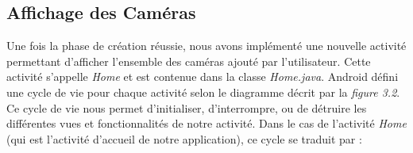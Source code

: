 \subsection{Affichage des Caméras}
Une fois la phase de création réussie, nous avons implémenté une nouvelle
activité permettant d'afficher l'ensemble des caméras ajouté par l'utilisateur.
Cette activité s'appelle \textit{Home} et est contenue dans la classe
\textit{Home.java}.\newline \newline
\indent Android défini une cycle de vie pour chaque activité selon le diagramme
décrit par la \textit{figure 3.2}.
\newline
\indent Ce cycle de vie nous permet d'initialiser, d'interrompre, ou de détruire
les différentes vues et fonctionnalités de notre activité. Dans le cas de
l'activité \textit{Home} (qui est l'activité d'accueil de notre application), ce cycle se traduit par : 
